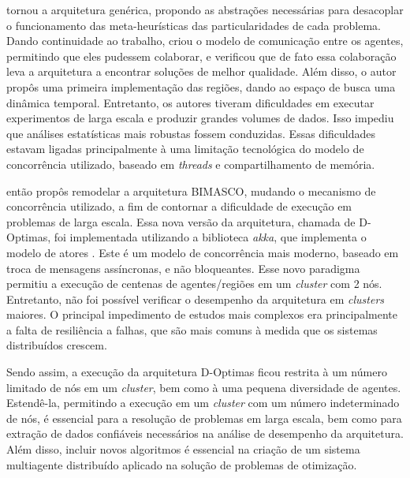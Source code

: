  tornou a arquitetura genérica, propondo as abstrações necessárias para desacoplar o funcionamento das meta-heurísticas das particularidades de cada problema. Dando continuidade ao trabalho,  criou o modelo de comunicação entre os agentes, permitindo que eles pudessem colaborar, e verificou que de fato essa colaboração leva a arquitetura a encontrar soluções de melhor qualidade. Além disso, o autor propôs uma primeira implementação das regiões, dando ao espaço de busca uma dinâmica temporal. Entretanto, os autores tiveram dificuldades em executar experimentos de larga escala e produzir grandes volumes de dados. Isso impediu que  análises estatísticas mais robustas fossem conduzidas. Essas dificuldades estavam ligadas principalmente à uma limitação tecnológica do modelo de concorrência utilizado, baseado em \textit{threads} e compartilhamento de memória. 

 então propôs remodelar a arquitetura BIMASCO, mudando o mecanismo de concorrência utilizado, a fim de contornar a dificuldade de execução em problemas de larga escala. Essa nova versão da arquitetura, chamada de D-Optimas, foi implementada utilizando a biblioteca \textit{akka}, que implementa o modelo de atores \cite{hewitt2013}. Este é um modelo de concorrência mais moderno, baseado em troca de mensagens assíncronas, e não bloqueantes. Esse novo paradigma permitiu a execução de centenas de  agentes/regiões em um \textit{cluster} com 2 nós. Entretanto, não foi possível verificar o desempenho da arquitetura em \textit{clusters} maiores. O principal impedimento de estudos mais complexos era principalmente a falta de resiliência a falhas, que são mais comuns à medida que os sistemas distribuídos crescem.


Sendo assim, a execução da arquitetura D-Optimas ficou restrita à um número limitado de nós em um \textit{cluster}, bem como à uma pequena diversidade de agentes. Estendê-la, permitindo a execução em um \textit{cluster} com um número indeterminado de nós, é essencial para a resolução de problemas em larga escala, bem como para extração de dados confiáveis necessários na análise de desempenho da arquitetura. Além disso, incluir novos algoritmos é essencial na criação de um sistema multiagente distribuído aplicado na solução de problemas de otimização. 

